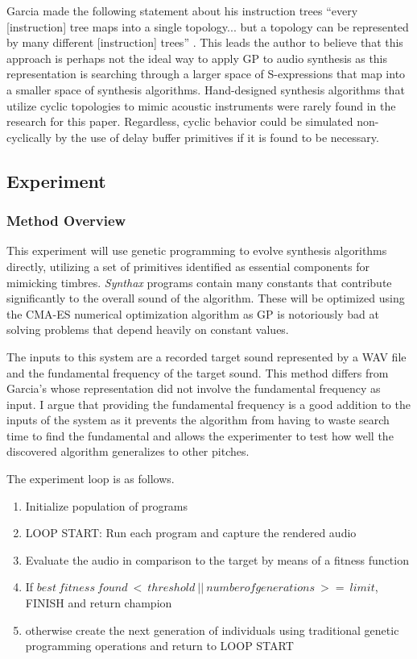 \documentclass[12pt]{article}
\newcommand{\audiolanguagenameupper}{\emph{Synthax}}
\begin{document}
Garcia made the following statement about his instruction trees ``every [instruction] tree maps into a single topology... but a topology can be represented by many different [instruction] trees'' \citep{garcia2012automatic}. This leads the author to believe that this approach is perhaps not the ideal way to apply GP to audio synthesis as this representation is searching through a larger space of S-expressions that map into a smaller space of synthesis algorithms. Hand-designed synthesis algorithms that utilize cyclic topologies to mimic acoustic instruments were rarely found in the research for this paper. Regardless, cyclic behavior could be simulated non-cyclically by the use of delay buffer primitives if it is found to be necessary.

\subsection{Experiment}
\subsubsection{Method Overview}\label{TMMETHOD}
This experiment will use genetic programming to evolve synthesis algorithms directly, utilizing a set of primitives identified as essential components for mimicking timbres. \audiolanguagenameupper{} programs contain many constants that contribute significantly to the overall sound of the algorithm. These will be optimized using the CMA-ES numerical optimization algorithm as GP is notoriously bad at solving problems that depend heavily on constant values.

The inputs to this system are a recorded target sound represented by a WAV file and the fundamental frequency of the target sound. This method differs from Garcia's whose representation did not involve the fundamental frequency as input. I argue that providing the fundamental frequency is a good addition to the inputs of the system as it prevents the algorithm from having to waste search time to find the fundamental and allows the experimenter to test how well the discovered algorithm generalizes to other pitches.

The experiment loop is as follows.

\begin{enumerate}
\item
Initialize population of \audiolaguagenamelower{} programs
\item
LOOP START:
Run each program and capture the rendered audio
\item
Evaluate the audio in comparison to the target by means of a fitness function
\item
If $best\ fitness\ found\ <\ threshold\ ||\ number of generations\ >=\ limit$, FINISH and return champion
\item
otherwise create the next generation of individuals using traditional genetic programming operations and return to LOOP START
\end{enumerate}
\end{document}
